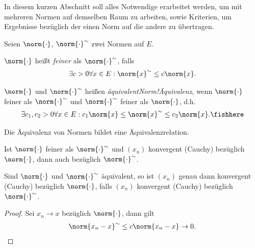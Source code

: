 In diesem kurzen Abschnitt soll alles Notwendige erarbeitet werden, um mit
mehreren Normen auf demselben Raum zu arbeiten, sowie Kriterien, um Ergebnisse
bezüglich der einen Norm auf die andere zu übertragen. 

\begin{defn}
\label{defn:1.8}
Seien $\norm{\cdot}$, $\norm{\cdot}^\sim$ zwei Normen  auf $E$.
\begin{defnenum}
  \item $\norm{\cdot}$ heißt \emph{feiner} als
  $\norm{\cdot}^\sim$, falls
\begin{align*}
\exists c > 0 \forall x\in E : \norm{x}^\sim \le c \norm{x}.
\end{align*}
\item $\norm{\cdot}$ und $\norm{\cdot}^\sim$ heißen
\emph{äquivalent}\emph{Norm!Äquivalenz}, wenn $\norm{\cdot}$ feiner als
$\norm{\cdot}^\sim$ und $\norm{\cdot}^\sim$ feiner als $\norm{\cdot}$, d.h.
\begin{align*}
\exists c_1,c_2 > 0 \forall x\in E : c_1 \norm{x} \le \norm{x}^\sim \le
c_2\norm{x}.\fishhere
\end{align*}
\end{defnenum}
\end{defn}

\begin{bemn}
Die Äquivalenz von Normen bildet eine Äquivalenzrelation.\maphere
\end{bemn}

\begin{prop}
\label{prop:1.9}
\begin{propenum}
  \item Ist $\norm{\cdot}$ feiner als $\norm{\cdot}^\sim$ und $(x_n)$
  konvergent (Cauchy) bezüglich $\norm{\cdot}$, dann auch bezüglich
  $\norm{\cdot}^\sim$.
  \item Sind $\norm{\cdot}$ und $\norm{\cdot}^\sim$ äquivalent, so ist $(x_n)$
  genau dann konvergent (Cauchy) bezüglich $\norm{\cdot}$, falls $(x_n)$
  konvergent (Cauchy) bezüglich $\norm{\cdot}^\sim$.\fishhere
\end{propenum}
\end{prop}
\begin{proof}
Sei $x_n\to x$ bezüglich $\norm{\cdot}$, dann gilt
\begin{align*}
\norm{x_n-x}^\sim \le c \norm{x_n-x} \to 0.\qedhere
\end{align*}
\end{proof}

